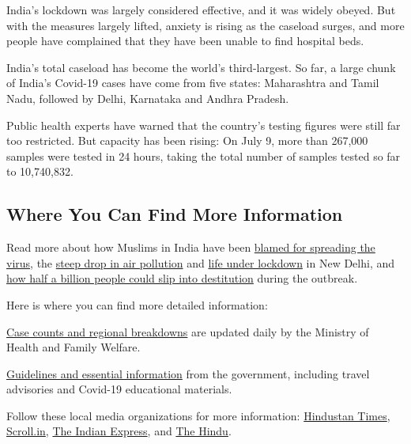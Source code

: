 India's lockdown was largely considered effective, and it was widely
obeyed. But with the measures largely lifted, anxiety is rising as the
caseload surges, and more people have complained that they have been
unable to find hospital beds.

India's total caseload has become the world's third-largest. So far, a
large chunk of India's Covid-19 cases have come from five states:
Maharashtra and Tamil Nadu, followed by Delhi, Karnataka and Andhra
Pradesh.

Public health experts have warned that the country's testing figures
were still far too restricted. But capacity has been rising: On July 9,
more than 267,000 samples were tested in 24 hours, taking the total
number of samples tested so far to 10,740,832.

\hypertarget{where-you-can-find-more-information}{%
\subsection{Where You Can Find More
Information}\label{where-you-can-find-more-information}}

Read more about how Muslims in India have been
\href{https://www.nytimes3xbfgragh.onion/2020/04/12/world/asia/india-coronavirus-muslims-bigotry.html}{blamed
for spreading the virus}, the
\href{https://www.nytimes3xbfgragh.onion/2020/04/08/world/asia/india-pollution-coronavirus.html}{steep
drop in air pollution} and
\href{https://www.nytimes3xbfgragh.onion/2020/05/01/world/asia/india-coronavirus-delhi.html}{life
under lockdown} in New Delhi, and
\href{https://www.nytimes3xbfgragh.onion/2020/04/30/world/asia/coronavirus-poverty-unemployment.html}{how
half a billion people could slip into destitution} during the outbreak.

Here is where you can find more detailed information:

\href{https://www.mohfw.gov.in/}{Case counts and regional breakdowns}
are updated daily by the Ministry of Health and Family Welfare.

\href{https://www.mohfw.gov.in/\#state-data}{Guidelines and essential
information} from the government, including travel advisories and
Covid-19 educational materials.

Follow these local media organizations for more information:
\href{https://www.hindustantimes.com/}{Hindustan Times},
\href{https://scroll.in/topic/56256/coronavirus-crisis}{Scroll.in},
\href{https://indianexpress.com/}{The Indian Express}, and
\href{https://www.thehindu.com/}{The Hindu}.

